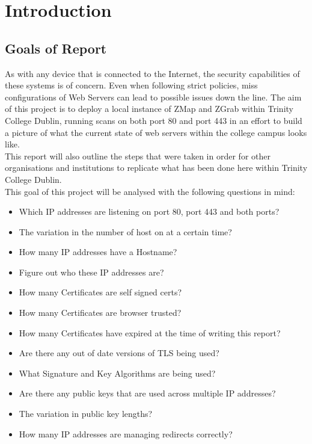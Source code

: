 \documentclass[a4wide,leqno,12pt]{report}
\begin{document}
\chapter{Introduction}
\section{Goals of Report}
As with any device that is connected to the Internet, the  security capabilities of these systems is of concern. Even when following strict policies,  miss configurations of Web Servers can lead to possible issues down the line. The aim of this project is to deploy a local instance of ZMap and ZGrab within Trinity College Dublin, running scans on both port 80 and port 443 in an effort to build a picture of what the current state of web servers within the college campus looks like.\\

This report  will also outline the steps that were taken in order for other organisations and institutions to replicate what has been done here within Trinity College Dublin.\\


This goal of this project will be analysed with the following questions in mind:
\begin{itemize}
  \item Which IP addresses are listening on port 80, port 443 and both ports?
  \item The variation in the number of host on at a certain time?
  \item How many IP addresses have a Hostname?
  \item Figure out who these IP addresses are?
  \item How many Certificates are self signed certs?
  \item How many Certificates are browser trusted?
   \item How many Certificates have expired at the time of writing this report?
  \item Are there any out of date versions of TLS being used?
  \item What Signature and Key Algorithms are being used?
  \item Are there any public keys that are used across multiple IP addresses?
  \item The variation in public key lengths?
  \item How many IP addresses are managing redirects correctly?
 
\end{itemize}
\end{document}
